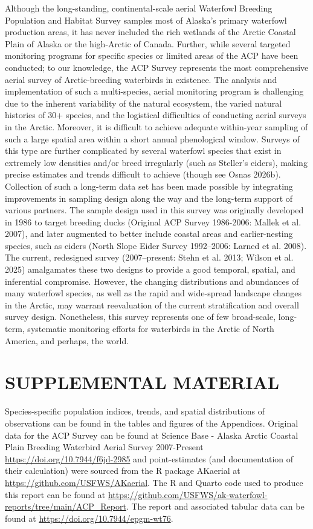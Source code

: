 \documentclass[
]{article}
\begin{document}
Although the long-standing, continental-scale aerial Waterfowl Breeding
Population and Habitat Survey samples most of Alaska's primary waterfowl
production areas, it has never included the rich wetlands of the Arctic
Coastal Plain of Alaska or the high-Arctic of Canada. Further, while
several targeted monitoring programs for specific species or limited
areas of the ACP have been conducted; to our knowledge, the ACP Survey
represents the most comprehensive aerial survey of Arctic-breeding
waterbirds in existence. The analysis and implementation of such a
multi-species, aerial monitoring program is challenging due to the
inherent variability of the natural ecosystem, the varied natural
histories of 30+ species, and the logistical difficulties of conducting
aerial surveys in the Arctic. Moreover, it is difficult to achieve
adequate within-year sampling of such a large spatial area within a
short annual phenological window. Surveys of this type are further
complicated by several waterfowl species that exist in extremely low
densities and/or breed irregularly (such as Steller's eiders), making
precise estimates and trends difficult to achieve (though see Osnas
2026b). Collection of such a long-term data set has been made possible
by integrating improvements in sampling design along the way and the
long-term support of various partners. The sample design used in this
survey was originally developed in 1986 to target breeding ducks
(Original ACP Survey 1986-2006: Mallek et al. 2007), and later augmented
to better include coastal areas and earlier-nesting species, such as
eiders (North Slope Eider Survey 1992--2006: Larned et al. 2008). The
current, redesigned survey (2007--present: Stehn et al. 2013; Wilson et
al. 2025) amalgamates these two designs to provide a good temporal,
spatial, and inferential compromise. However, the changing distributions
and abundances of many waterfowl species, as well as the rapid and
wide-spread landscape changes in the Arctic, may warrant reevaluation of
the current stratification and overall survey design. Nonetheless, this
survey represents one of few broad-scale, long-term, systematic
monitoring efforts for waterbirds in the Arctic of North America, and
perhaps, the world.

\section*{SUPPLEMENTAL MATERIAL}\label{supplemental-material}

Species-specific population indices, trends, and spatial distributions
of observations can be found in the tables and figures of the
Appendices. Original data for the ACP Survey can be found at Science
Base - Alaska Arctic Coastal Plain Breeding Waterbird Aerial Survey
2007-Present \url{https://doi.org/10.7944/f6jd-2985} and point-estimates
(and documentation of their calculation) were sourced from the R package
AKaerial at \url{https://github.com/USFWS/AKaerial}. The R and Quarto
code used to produce this report can be found at
\url{https://github.com/USFWS/ak-waterfowl-reports/tree/main/ACP_Report}.
The report and associated tabular data can be found at
\url{https://doi.org/10.7944/epgm-wt76}.
\end{document}
